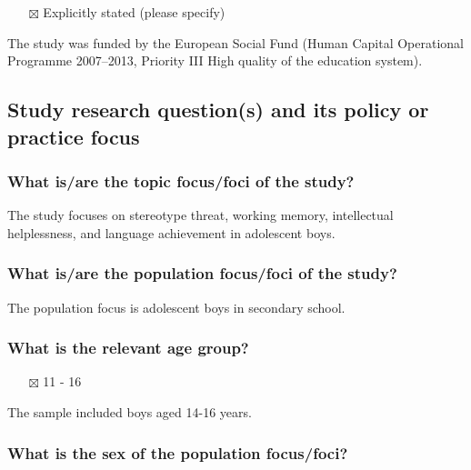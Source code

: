 \documentclass[
  doc, a4paper]{apa7}
\providecommand{\tightlist}{%
  \setlength{\itemsep}{0pt}\setlength{\parskip}{0pt}}
\begin{document}
\begin{itemize}
\tightlist
\item[$\boxtimes$]
  Explicitly stated (please specify)
\end{itemize}

The study was funded by the European Social Fund (Human Capital Operational Programme 2007--2013, Priority III High quality of the education system).

\subsection{Study research question(s) and its policy or practice focus}\label{study-research-questions-and-its-policy-or-practice-focus}

\subsubsection{What is/are the topic focus/foci of the study?}\label{what-isare-the-topic-focusfoci-of-the-study}

The study focuses on stereotype threat, working memory, intellectual helplessness, and language achievement in adolescent boys.

\subsubsection{What is/are the population focus/foci of the study?}\label{what-isare-the-population-focusfoci-of-the-study}

The population focus is adolescent boys in secondary school.

\subsubsection{What is the relevant age group?}\label{what-is-the-relevant-age-group}

\begin{itemize}
\tightlist
\item[$\boxtimes$]
  11 - 16
\end{itemize}

The sample included boys aged 14-16 years.

\subsubsection{What is the sex of the population focus/foci?}\label{what-is-the-sex-of-the-population-focusfoci}
\end{document}
